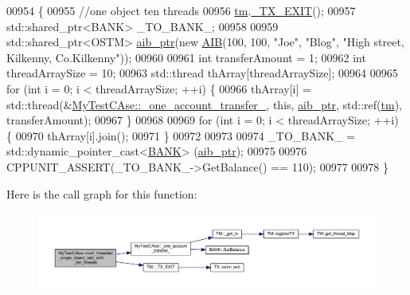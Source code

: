 \begin{DoxyCode}
00954                                                                    \{
00955     \textcolor{comment}{//one object ten threads}
00956     \hyperlink{class_my_test_c_ase_a422e6e5d4ddedea384be96031c89b72b_a422e6e5d4ddedea384be96031c89b72b}{tm}.\hyperlink{class_t_m_a5e2d1127f2429f2f524d25f430eade06_a5e2d1127f2429f2f524d25f430eade06}{\_TX\_EXIT}();
00957     std::shared\_ptr<BANK> \_TO\_BANK\_;
00958     
00959     std::shared\_ptr<OSTM> \hyperlink{class_my_test_c_ase_adad50e8278b64aa0321000b528e5362c_adad50e8278b64aa0321000b528e5362c}{aib\_ptr}(\textcolor{keyword}{new} \hyperlink{class_a_i_b}{AIB}(100, 100, \textcolor{stringliteral}{"Joe"}, \textcolor{stringliteral}{"Blog"}, \textcolor{stringliteral}{"High street, Kilkenny,
       Co.Kilkenny"}));
00960     
00961     \textcolor{keywordtype}{int} transferAmount = 1;
00962     \textcolor{keywordtype}{int} threadArraySize = 10; 
00963     std::thread thArray[threadArraySize];
00964 
00965     \textcolor{keywordflow}{for} (\textcolor{keywordtype}{int} i = 0; i < threadArraySize; ++i) \{
00966         thArray[i] = std::thread(&\hyperlink{class_my_test_c_ase_afe25c2ed3a8ab035f472fff6575f0e48_afe25c2ed3a8ab035f472fff6575f0e48}{MyTestCAse::\_one\_account\_transfer\_}, \textcolor{keyword}{
      this}, \hyperlink{class_my_test_c_ase_adad50e8278b64aa0321000b528e5362c_adad50e8278b64aa0321000b528e5362c}{aib\_ptr}, std::ref(\hyperlink{class_my_test_c_ase_a422e6e5d4ddedea384be96031c89b72b_a422e6e5d4ddedea384be96031c89b72b}{tm}), transferAmount);
00967     \}
00968     
00969     \textcolor{keywordflow}{for} (\textcolor{keywordtype}{int} i = 0; i < threadArraySize; ++i) \{
00970         thArray[i].join();
00971     \}
00972     
00973 
00974     \_TO\_BANK\_ = std::dynamic\_pointer\_cast<\hyperlink{class_b_a_n_k}{BANK}> (\hyperlink{class_my_test_c_ase_adad50e8278b64aa0321000b528e5362c_adad50e8278b64aa0321000b528e5362c}{aib\_ptr});
00975     
00976     CPPUNIT\_ASSERT(\_TO\_BANK\_->GetBalance() == 110);
00977 
00978 \}
\end{DoxyCode}


Here is the call graph for this function\+:
\nopagebreak
\begin{figure}[H]
\begin{center}
\leavevmode
\includegraphics[width=350pt]{class_my_test_c_ase_afea0c5983bf1fcc38d8962cfa6277da4_afea0c5983bf1fcc38d8962cfa6277da4_cgraph}
\end{center}
\end{figure}



